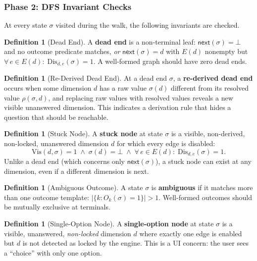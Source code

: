 \documentclass[11pt]{article}
\theoremstyle{definition}
\newtheorem{definition}[theorem]{Definition}
\newcommand{\Edg}[1]{E(#1)}            %
\newcommand{\sel}{\sigma}              %
\newcommand{\res}[2]{\rho(#1,#2)}      %
\newcommand{\Vis}{\mathrm{Vis}}        %
\newcommand{\Dis}{\mathrm{Dis}}        %
\begin{document}
\subsubsection{Phase 2: DFS Invariant Checks}\label{sec:dfsinvariants}

At every state $\sel$ visited during the walk, the following invariants
are checked.

\begin{definition}[Dead End]\label{def:deadend}
A \textbf{dead end} is a non-terminal leaf: $\mathsf{next}(\sel) = \bot$
and no outcome predicate matches, \emph{or} $\mathsf{next}(\sel) = d$
with $\Edg{d}$ nonempty but
$\forall\, e \in \Edg{d}:\;\Dis_{d,e}(\sel)=1$.
A well-formed graph should have zero dead ends.
\end{definition}

\begin{definition}[Re-Derived Dead End]\label{def:rederived}
At a dead end $\sel$, a \textbf{re-derived dead end} occurs when some
dimension $d$ has a raw value $\sel(d)$ different from its resolved value
$\res{\sel}{d}$, and replacing raw values with resolved values reveals a
new visible unanswered dimension. This indicates a derivation rule that
hides a question that should be reachable.
\end{definition}

\begin{definition}[Stuck Node]\label{def:stuck}
A \textbf{stuck node} at state $\sel$ is a visible, non-derived,
non-locked, unanswered dimension $d$ for which every edge is disabled:
\[
  \Vis(d,\sel) = 1 \;\wedge\;
  \sel(d) = \bot \;\wedge\;
  \forall\, e \in \Edg{d}:\; \Dis_{d,e}(\sel) = 1.
\]
Unlike a dead end (which concerns only $\mathsf{next}(\sel)$), a stuck
node can exist at any dimension, even if a different dimension is next.
\end{definition}

\begin{definition}[Ambiguous Outcome]\label{def:ambig}
A state $\sel$ is \textbf{ambiguous} if it matches more than one outcome
template: $|\{k : O_k(\sel) = 1\}| > 1$. Well-formed outcomes should
be mutually exclusive at terminals.
\end{definition}

\begin{definition}[Single-Option Node]\label{def:singleopt}
A \textbf{single-option node} at state $\sel$ is a visible, unanswered,
\emph{non-locked} dimension $d$ where exactly one edge is enabled but
$d$ is not detected as locked by the engine. This is a UI concern: the
user sees a ``choice'' with only one option.
\end{definition}
\end{document}
